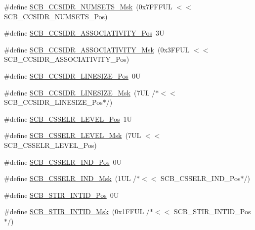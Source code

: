 \begin{DoxyCompactItemize}
\#define \mbox{\hyperlink{group___c_m_s_i_s___s_c_b_ga47d1f01185d7a039334031008386c5a8}{S\+C\+B\+\_\+\+C\+C\+S\+I\+D\+R\+\_\+\+N\+U\+M\+S\+E\+T\+S\+\_\+\+Msk}}~(0x7\+F\+F\+F\+U\+L $<$$<$ S\+C\+B\+\_\+\+C\+C\+S\+I\+D\+R\+\_\+\+N\+U\+M\+S\+E\+T\+S\+\_\+\+Pos)
\item 
\#define \mbox{\hyperlink{group___c_m_s_i_s___s_c_b_gae67f2f83976b819fb3039fc35cfef0fb}{S\+C\+B\+\_\+\+C\+C\+S\+I\+D\+R\+\_\+\+A\+S\+S\+O\+C\+I\+A\+T\+I\+V\+I\+T\+Y\+\_\+\+Pos}}~3U
\item 
\#define \mbox{\hyperlink{group___c_m_s_i_s___s_c_b_gae093c4c635dad43845967512fa87173a}{S\+C\+B\+\_\+\+C\+C\+S\+I\+D\+R\+\_\+\+A\+S\+S\+O\+C\+I\+A\+T\+I\+V\+I\+T\+Y\+\_\+\+Msk}}~(0x3\+F\+F\+U\+L $<$$<$ S\+C\+B\+\_\+\+C\+C\+S\+I\+D\+R\+\_\+\+A\+S\+S\+O\+C\+I\+A\+T\+I\+V\+I\+T\+Y\+\_\+\+Pos)
\item 
\#define \mbox{\hyperlink{group___c_m_s_i_s___s_c_b_ga750388e1509b36d35568a68a7a1e1ff7}{S\+C\+B\+\_\+\+C\+C\+S\+I\+D\+R\+\_\+\+L\+I\+N\+E\+S\+I\+Z\+E\+\_\+\+Pos}}~0U
\item 
\#define \mbox{\hyperlink{group___c_m_s_i_s___s_c_b_ga07b3bdffe4c289b9c19c70cf698499da}{S\+C\+B\+\_\+\+C\+C\+S\+I\+D\+R\+\_\+\+L\+I\+N\+E\+S\+I\+Z\+E\+\_\+\+Msk}}~(7\+U\+L /$\ast$$<$$<$ S\+C\+B\+\_\+\+C\+C\+S\+I\+D\+R\+\_\+\+L\+I\+N\+E\+S\+I\+Z\+E\+\_\+\+Pos$\ast$/)
\item 
\#define \mbox{\hyperlink{group___c_m_s_i_s___s_c_b_ga8c014c9678bc9072f10459a1e14b973c}{S\+C\+B\+\_\+\+C\+S\+S\+E\+L\+R\+\_\+\+L\+E\+V\+E\+L\+\_\+\+Pos}}~1U
\item 
\#define \mbox{\hyperlink{group___c_m_s_i_s___s_c_b_gaa24e3a6d6960acff3d6949e416046cf0}{S\+C\+B\+\_\+\+C\+S\+S\+E\+L\+R\+\_\+\+L\+E\+V\+E\+L\+\_\+\+Msk}}~(7\+U\+L $<$$<$ S\+C\+B\+\_\+\+C\+S\+S\+E\+L\+R\+\_\+\+L\+E\+V\+E\+L\+\_\+\+Pos)
\item 
\#define \mbox{\hyperlink{group___c_m_s_i_s___s_c_b_ga70e80783c3bd7b11504c63b052b0c0b9}{S\+C\+B\+\_\+\+C\+S\+S\+E\+L\+R\+\_\+\+I\+N\+D\+\_\+\+Pos}}~0U
\item 
\#define \mbox{\hyperlink{group___c_m_s_i_s___s_c_b_ga4e5d98f4d43366cadcc5c3d7ac37228c}{S\+C\+B\+\_\+\+C\+S\+S\+E\+L\+R\+\_\+\+I\+N\+D\+\_\+\+Msk}}~(1\+U\+L /$\ast$$<$$<$ S\+C\+B\+\_\+\+C\+S\+S\+E\+L\+R\+\_\+\+I\+N\+D\+\_\+\+Pos$\ast$/)
\item 
\#define \mbox{\hyperlink{group___c_m_s_i_s___s_c_b_gaeb4a916d84d967c1bab8e88800a28984}{S\+C\+B\+\_\+\+S\+T\+I\+R\+\_\+\+I\+N\+T\+I\+D\+\_\+\+Pos}}~0U
\item 
\#define \mbox{\hyperlink{group___c_m_s_i_s___s_c_b_ga7b67f900eb9c63b04e67f8fa6ddcd8ed}{S\+C\+B\+\_\+\+S\+T\+I\+R\+\_\+\+I\+N\+T\+I\+D\+\_\+\+Msk}}~(0x1\+F\+F\+U\+L /$\ast$$<$$<$ S\+C\+B\+\_\+\+S\+T\+I\+R\+\_\+\+I\+N\+T\+I\+D\+\_\+\+Pos$\ast$/)
$$
\end{DoxyCompactItemize}
